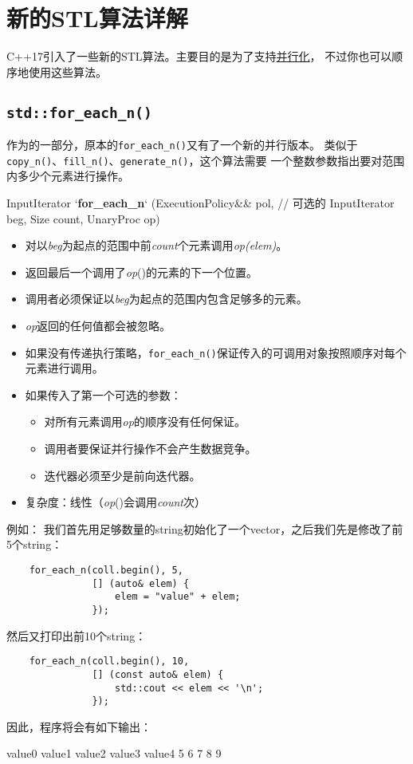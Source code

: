 {\lstset{frame=single, xleftmargin=13pt, xrightmargin=12pt}}
{}


\chapter{新的STL算法详解}\label{ch23}
C++17引入了一些新的STL算法。主要目的是为了支持\hyperref[ch22]{并行化}，
不过你也可以顺序地使用这些算法。



\section{\texttt{std::for\_each\_n()}}
作为的一部分，原本的\texttt{for\_each\_n()}又有了一个新的并行版本。
类似于\texttt{copy\_n()}、\texttt{fill\_n()}、\texttt{generate\_n()}，这个算法需要
一个整数参数指出要对范围内多少个元素进行操作。
\begin{algolisting}
InputIterator
`\textbf{for\_each\_n}` (ExecutionPolicy&& pol,  // 可选的
            InputIterator beg,
            Size count,
            UnaryProc op)
\end{algolisting}
\begin{itemize}
    \item 对以\emph{beg}为起点的范围中前\emph{count}个元素调用\emph{op(elem)}。
    \item 返回最后一个调用了\emph{op}()的元素的下一个位置。
    \item 调用者必须保证以\emph{beg}为起点的范围内包含足够多的元素。
    \item \emph{op}返回的任何值都会被忽略。
    \item 如果没有传递执行策略，\texttt{for\_each\_n()}保证传入的可调用对象按照顺序对每个元素进行调用。
    \item 如果传入了第一个可选的参数：
    \begin{itemize}
        \item 对所有元素调用\emph{op}的顺序没有任何保证。
        \item 调用者要保证并行操作不会产生数据竞争。
        \item 迭代器必须至少是前向迭代器。
    \end{itemize}
    \item 复杂度：线性（\emph{op}()会调用\emph{count}次）
\end{itemize}
例如：
我们首先用足够数量的string初始化了一个vector，之后我们先是修改了前5个string：
\begin{lstlisting}
    for_each_n(coll.begin(), 5,
               [] (auto& elem) {
                   elem = "value" + elem;
               });
\end{lstlisting}
然后又打印出前10个string：
\begin{lstlisting}
    for_each_n(coll.begin(), 10,
               [] (const auto& elem) {
                   std::cout << elem << '\n';
               });
\end{lstlisting}
因此，程序将会有如下输出：
\begin{blacklisting}
    value0
    value1
    value2
    value3
    value4
    5
    6
    7
    8
    9
\end{blacklisting}


